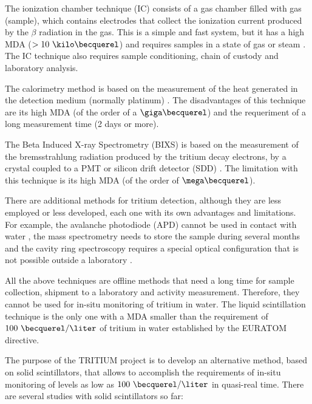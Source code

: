 The ionization chamber technique (IC) consists of a gas chamber filled with gas (sample), which contains electrodes that collect the ionization current produced by the $\beta$ radiation in the gas. This is a simple and fast system, but it has a high MDA ($> 10~\kilo\becquerel$) and requires samples in a state of gas or steam \cite{IonizationChamber1, IonizationChamber2}. The IC technique also requires sample conditioning, chain of custody and laboratory analysis. 

The calorimetry method is based on the measurement of the heat generated in the detection medium (normally platinum) \cite{Calorimeter1, Calorimeter2}. The disadvantages of this technique are its high MDA (of the order of a $\giga\becquerel$) and the requeriment of a long measurement time (2 days or more).

The Beta Induced X-ray Spectrometry (BIXS) is based on the measurement of the bremsstrahlung radiation produced by the tritium decay electrons, by a  crystal coupled to a PMT  \cite{XRays1, XRays2} or silicon drift detector (SDD) \cite{Bremstrahlung}. The limitation with this technique is its high MDA (of the order of $\mega\becquerel$).

There are additional methods for tritium detection, although they are less employed or less developed, each one with its own advantages and limitations. For example, the avalanche photodiode (APD) cannot be used in contact with water \cite{APD},  the mass spectrometry needs to store the sample during several months \cite{Spectrometry} and the cavity ring spectroscopy requires a special optical configuration that is not possible outside a laboratory \cite{Ring}.

All the above techniques are offline methods that need a long time for sample collection, shipment to a laboratory and activity measurement. Therefore, they cannot be used for in-situ monitoring of tritium in water. The liquid scintillation technique is the only one with a MDA smaller than the requirement of $100~\becquerel/\liter$ of tritium in water established by the EURATOM directive. 

The purpose of the TRITIUM project is to develop an alternative method, based on solid scintillators, that allows to accomplish the requirements of in-situ monitoring of levels as low as $100~\becquerel/\liter$ in quasi-real time. There are several studies with solid scintillators so far:

